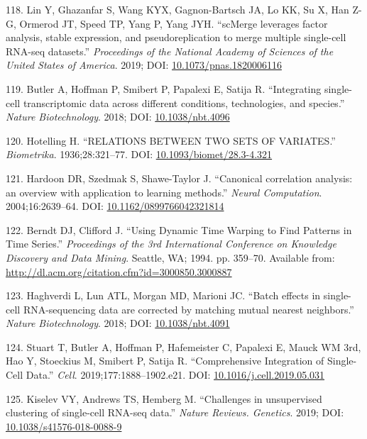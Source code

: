 \documentclass[11pt,a4paper,titlepage,twoside,openright]{style/unimelbthesis}
\theoremstyle{definition}
\theoremstyle{definition}
\theoremstyle{definition}
\theoremstyle{remark}
\begin{document}
\begin{mainmatter}
\leavevmode\hypertarget{ref-Lin2019-lk}{}%
118. Lin Y, Ghazanfar S, Wang KYX, Gagnon-Bartsch JA, Lo KK, Su X, Han Z-G, Ormerod JT, Speed TP, Yang P, Yang JYH. ``scMerge leverages factor analysis, stable expression, and pseudoreplication to merge multiple single-cell RNA-seq datasets.'' \emph{Proceedings of the National Academy of Sciences of the United States of America}. 2019; DOI: \href{https://doi.org/10.1073/pnas.1820006116}{10.1073/pnas.1820006116}

\leavevmode\hypertarget{ref-Butler2018-js}{}%
119. Butler A, Hoffman P, Smibert P, Papalexi E, Satija R. ``Integrating single-cell transcriptomic data across different conditions, technologies, and species.'' \emph{Nature Biotechnology}. 2018; DOI: \href{https://doi.org/10.1038/nbt.4096}{10.1038/nbt.4096}

\leavevmode\hypertarget{ref-Hotelling1936-ni}{}%
120. Hotelling H. ``RELATIONS BETWEEN TWO SETS OF VARIATES.'' \emph{Biometrika}. 1936;28:321--77. DOI: \href{https://doi.org/10.1093/biomet/28.3-4.321}{10.1093/biomet/28.3-4.321}

\leavevmode\hypertarget{ref-Hardoon2004-ev}{}%
121. Hardoon DR, Szedmak S, Shawe-Taylor J. ``Canonical correlation analysis: an overview with application to learning methods.'' \emph{Neural Computation}. 2004;16:2639--64. DOI: \href{https://doi.org/10.1162/0899766042321814}{10.1162/0899766042321814}

\leavevmode\hypertarget{ref-Berndt1994-lh}{}%
122. Berndt DJ, Clifford J. ``Using Dynamic Time Warping to Find Patterns in Time Series.'' \emph{Proceedings of the 3rd International Conference on Knowledge Discovery and Data Mining}. Seattle, WA; 1994. pp. 359--70. Available from: \url{http://dl.acm.org/citation.cfm?id=3000850.3000887}

\leavevmode\hypertarget{ref-Haghverdi2018-bd}{}%
123. Haghverdi L, Lun ATL, Morgan MD, Marioni JC. ``Batch effects in single-cell RNA-sequencing data are corrected by matching mutual nearest neighbors.'' \emph{Nature Biotechnology}. 2018; DOI: \href{https://doi.org/10.1038/nbt.4091}{10.1038/nbt.4091}

\leavevmode\hypertarget{ref-Stuart2019-lq}{}%
124. Stuart T, Butler A, Hoffman P, Hafemeister C, Papalexi E, Mauck WM 3rd, Hao Y, Stoeckius M, Smibert P, Satija R. ``Comprehensive Integration of Single-Cell Data.'' \emph{Cell}. 2019;177:1888--1902.e21. DOI: \href{https://doi.org/10.1016/j.cell.2019.05.031}{10.1016/j.cell.2019.05.031}

\leavevmode\hypertarget{ref-Kiselev2019-mg}{}%
125. Kiselev VY, Andrews TS, Hemberg M. ``Challenges in unsupervised clustering of single-cell RNA-seq data.'' \emph{Nature Reviews. Genetics}. 2019; DOI: \href{https://doi.org/10.1038/s41576-018-0088-9}{10.1038/s41576-018-0088-9}


\end{mainmatter}
\end{document}
